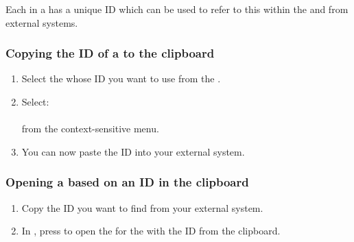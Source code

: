 Each \gdcase{} in a \gdproject{} has a unique ID which can be used to refer to this \gdcase{} within the \gdproject{} and from external systems.

\subsubsection{Copying the ID of a \gdcase{} to the clipboard}

\begin{enumerate}
\item Select the \gdcase{} whose ID you want to use from the \gdtestcasebrowser{}.
\item Select:\\
\\
from the context-sensitive menu.
\item You can now paste the ID into your external system.
\end{enumerate}


\subsubsection{Opening a \gdcase{} based on an ID in the clipboard}
\begin{enumerate}
\item Copy the \gdcase{} ID you want to find from your external system.
\item In \app{}, press  to open the \gdtestcaseeditor{}  for the \gdcase{} with the ID from the clipboard.
\end{enumerate}
